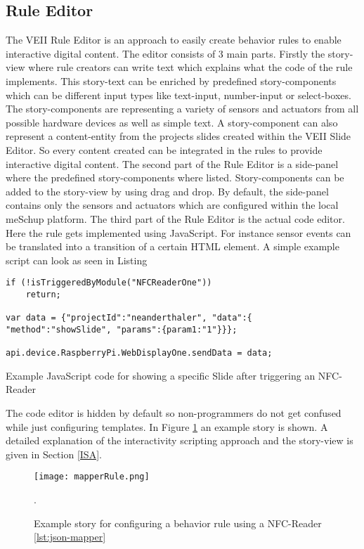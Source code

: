 \subsection{Rule Editor}
The VEII Rule Editor is an approach to easily create behavior rules to enable interactive digital content. The editor consists of 3 main parts. 
Firstly the story-view where rule creators can write text which explains what the code of the rule implements. This story-text can be enriched by predefined story-components which can be different input types like text-input, number-input or select-boxes. The story-components are representing a variety of sensors and actuators from all possible hardware devices as well as simple text. A story-component can also represent a content-entity from the projects slides created within the VEII Slide Editor. So every content created can be integrated in the rules to provide interactive digital content.
The second part of the Rule Editor is a side-panel where the predefined story-components where listed. Story-components can be added to the story-view by using drag and drop. By default, the side-panel contains only the sensors and actuators which are configured within the local meSchup platform.
The third part of the Rule Editor is the actual code editor. Here the rule gets implemented using JavaScript. For instance sensor events can be translated into a transition of a certain HTML element. A simple example script can look as seen in Listing 

\begin{Listing}
\begin{lstlisting}
if (!isTriggeredByModule("NFCReaderOne"))
    return;
    
var data = {"projectId":"neanderthaler", "data":{ "method":"showSlide", "params":{param1:"1"}}};

api.device.RaspberryPi.WebDisplayOne.sendData = data;
\end{lstlisting}
\caption{Example JavaScript code for showing a specific Slide after triggering an NFC-Reader}
\label{lst:example-code}
\end{Listing}

The code editor is hidden by default so non-programmers do not get confused while just configuring templates. In Figure \ref{fig:mapperrule} an example story is shown.
A detailed explanation of the interactivity scripting approach and the story-view is given in Section \ref{ISA}.

\begin{figure}
  \begin{center}
    \texttt{[image: mapperRule.png]}
    \caption{Example story for configuring a behavior rule using a NFC-Reader \ref{lst:json-mapper}}.
    \label{fig:mapperrule}
  \end{center}
\end{figure}

